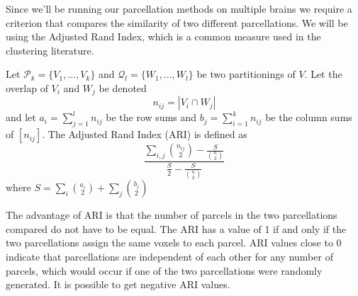 Since we'll be running our parcellation methods on multiple brains we
require a criterion that compares the similarity of two different
parcellations. We will be using the Adjusted Rand Index, which is a
common measure used in the clustering literature.

\begin{definition} \label{ari}
Let $\mathcal{P}_k = \{V_1, ..., V_k\}$ and
    $\mathcal{Q}_l = \{W_1, ..., W_l\}$ be two partitionings of $V$.
Let the overlap of $V_i$ and $W_j$ be denoted 
\[ n_{ij} = | V_i \cap W_j | \]
and let $a_i = \sum_{j=1}^l n_{ij}$ be the row sums and
        $b_j = \sum_{i=1}^k n_{ij}$ be the column sums of $[n_{ij}]$.
The Adjusted Rand Index (ARI) is defined as
\[ \frac{\sum_{i,j} \binom{n_{ij}}{2} -
         \frac{S}{\binom{n}{2}} 
        }
        {\frac{S}{2} - \frac{S}{\binom{n}{2}}} \]
where $S = \sum_i \binom{a_i}{2} + \sum_j \binom{b_j}{2}$
\end{definition}

The advantage of ARI is that the number of parcels in the two
parcellations compared do not have to be equal. The ARI has a value of
1 if and only if the two parcellations assign the same voxels to each
parcel. ARI values close to 0 indicate that parcellations are
independent of each other for any number of parcels, which would occur
if one of the two parcellations were randomly generated. It is possible
to get negative ARI values.
